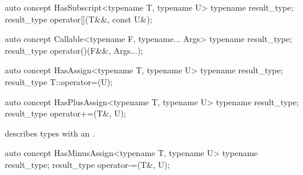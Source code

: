 \documentclass[american,twoside]{book}
\begin{document}
\begin{itemdescr}
\pnum
{}
\end{itemdescr}

\begin{itemdecl}
auto concept HasSubscript<typename T, typename U> {
  typename result_type;
  result_type operator[](T&&, const U&);
}
\end{itemdecl}

\begin{itemdescr}
\pnum
{}
\end{itemdescr}

\begin{itemdecl}
auto concept Callable<typename F, typename... Args> {
  typename result_type;
  result_type operator()(F&&, Args...);
}
\end{itemdecl}

\begin{itemdescr}
\pnum 
{}
\end{itemdescr}

\begin{itemdecl}
auto concept HasAssign<typename T, typename U> {
  typename result_type;
  result_type T::operator=(U);
}
\end{itemdecl}

\begin{itemdescr}
\pnum
{}
\end{itemdescr}

\begin{itemdecl}
auto concept HasPlusAssign<typename T, typename U> {
  typename result_type;
  result_type operator+=(T&, U);
}
\end{itemdecl}

\begin{itemdescr}
\pnum
\mbox{\reallynote} describes types with an \mbox{}.
\end{itemdescr}

\begin{itemdecl}
auto concept HasMinusAssign<typename T, typename U> {
  typename result_type;
  result_type operator-=(T&, U);
}
\end{itemdecl}
\end{document}
